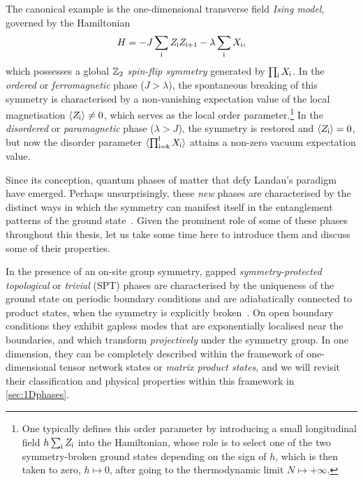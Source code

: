The canonical example is the one-dimensional transverse field \emph{Ising model}, governed by the Hamiltonian~\cite{Degennes1963}
\begin{equation}\label{eq:TFIM}
	H = -J\sum_{\mathsf{i}} Z_{\mathsf{i}}Z_{\mathsf{i}+1} - \lambda \sum_{\mathsf{i}} X_{\mathsf{i}},
\end{equation}
which possesses a global $\mathbb Z_2$ \emph{spin-flip symmetry} generated by $\prod_{\mathsf{i}} X_{\mathsf{i}}$. In the \emph{ordered} or \emph{ferromagnetic} phase ($J > \lambda$), the spontaneous breaking of this symmetry is characterised by a non-vanishing expectation value of the local magnetisation $\langle Z_{\mathsf{i}} \rangle \neq 0$, which serves as the local order parameter.\footnote{One typically defines this order parameter by introducing a small longitudinal field $h\sum_{\mathsf{i}} Z_{\mathsf{i}}$ into the Hamiltonian, whose role is to select one of the two symmetry-broken ground states depending on the sign of $h$, which is then taken to zero, $h\mapsto 0$, after going to the thermodynamic limit $N\mapsto+\infty$.} In the \emph{disordered} or \emph{paramagnetic} phase ($\lambda > J$), the symmetry is restored and $\langle Z_{\mathsf{i}} \rangle = 0$, but now the disorder parameter $\langle \prod_{\mathsf{i}=\mathsf{k}}^{\mathsf{l}} X_{\mathsf{i}}\rangle$ attains a non-zero vacuum expectation value.

\bigskip\noindent Since its conception, quantum phases of matter that defy Landau's paradigm have emerged. Perhaps unsurprisingly, these \emph{new} phases are characterised by the distinct ways in which the symmetry can manifest itself in the entanglement patterns of the ground state~\cite{Bravyi2006,Schuch2011,Chen2010,Zeng2015,Wen2016,McGreevy2022,Chen2025}. Given the prominent role of some of these phases throughout this thesis, let us take some time here to introduce them and discuss some of their properties.

\bigskip\noindent In the presence of an on-site group symmetry, gapped \emph{symmetry-protected topological} or \emph{trivial} (SPT) phases are characterised by the uniqueness of the ground state on periodic boundary conditions and are adiabatically connected to product states, when the symmetry is explicitly broken~\cite{Chen2010,Chen2011}. On open boundary conditions they exhibit gapless modes that are exponentially localised near the boundaries, and which transform \emph{projectively} under the symmetry group. In one dimension, they can be completely described within the framework of one-dimensional tensor network states or \emph{matrix product states}, and we will revisit their classification and physical properties within this framework in \cref{sec:1Dphases}.

